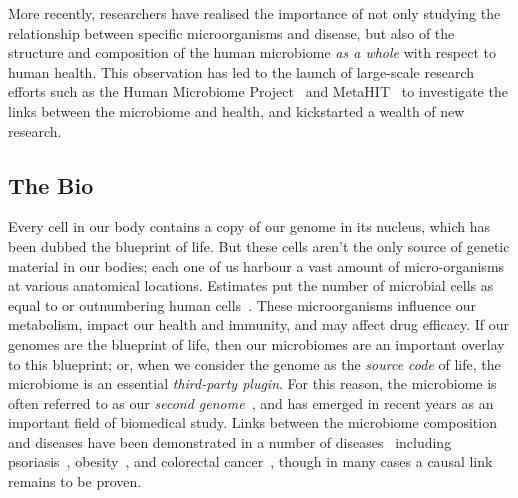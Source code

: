 \begin{justify}
More recently, researchers have realised the importance of not only studying the relationship between specific microorganisms and disease, but also of the structure and composition of the human microbiome \emph{as a whole} with respect to human health. This observation has led to the launch of large-scale research efforts such as the Human Microbiome Project~\cite{turnbaugh2007human} and MetaHIT~\cite{ehrlich2011metahit} to investigate the links between the microbiome and health, and kickstarted a wealth of new research.


\subsection{The Bio}

Every cell in our body contains a copy of our genome in its nucleus, which has been dubbed the blueprint of life. But these cells aren't the only source of genetic material in our bodies; each one of us harbour a vast amount of micro-organisms at various anatomical locations. %
Estimates put the number of microbial cells as equal to or outnumbering human cells~\cite{sender2016outnumbered}. These microorganisms influence our metabolism, impact our health and immunity, and may affect drug efficacy. If our genomes are the blueprint of life, then our microbiomes are an important overlay to this blueprint; or, when we consider the genome as the \emph{source code} of life, the microbiome is an essential \emph{third-party plugin}. For this reason, the microbiome is often referred to as our \emph{second genome}~\cite{grice2012microbiome}, and has emerged in recent years as an important field of biomedical study. Links between the microbiome composition and diseases have been demonstrated in a number of diseases~\cite{cho2012human} including psoriasis~\cite{gao2008substantial}, obesity~\cite{turnbaugh2006obesity, ley2005obesity}, and colorectal cancer~\cite{castellarin2012fusobacterium,kostic2012genomic}, though in many cases a causal link remains to be proven.


\end{justify}
